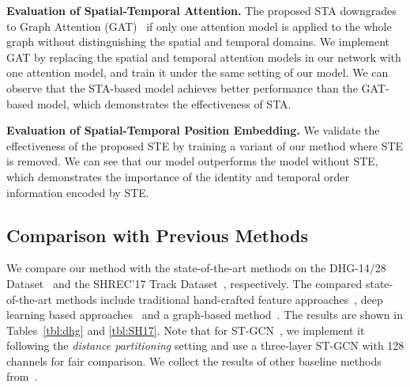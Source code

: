 \documentclass{bmvc2k}
\begin{document}
\textbf{Evaluation of Spatial-Temporal Attention.} The proposed STA downgrades to Graph Attention (GAT)~\cite{velivckovic2017graph} if only one attention model is applied to the whole graph without distinguishing the spatial and temporal domains. We implement GAT by replacing the spatial and temporal attention models in our network with one attention model, and train it under the same setting of our model. We can observe that the STA-based model achieves better performance than the GAT-based model, which demonstrates the effectiveness of STA.

\textbf{Evaluation of Spatial-Temporal Position Embedding.} We validate the effectiveness of the proposed STE by training a variant of our method where STE is removed. We can see that our model outperforms the model without STE, which demonstrates the importance of the identity and temporal order information encoded by STE.




\subsection{Comparison with Previous Methods}
\label{sec:comparison}

We compare our method with the state-of-the-art methods on the DHG-14/28 Dataset~\cite{de2016skeleton} and the SHREC'17 Track Dataset~\cite{de2017shrec}, respectively. The compared state-of-the-art methods include traditional hand-crafted feature approaches~\cite{chen2017motion,oreifej2013hon4d,devanne20153,ohn2013joint,de2017dynamic,de2016skeleton,caputo2018comparing,boulahia2017dynamic}, deep learning based approaches~\cite{nunez2018convolutional,hou2018spatial,de2017shrec} and a graph-based method~\cite{yan2018spatial}. The results are shown in Tables~\ref{tbl:dhg} and \ref{tbl:SH17}. Note that for ST-GCN~\cite{yan2018spatial}, we implement it following the \emph{distance partitioning} setting and use a three-layer ST-GCN with 128 channels for fair comparison. We collect the results of other baseline methods from~\cite{hou2018spatial}.
\end{document}
